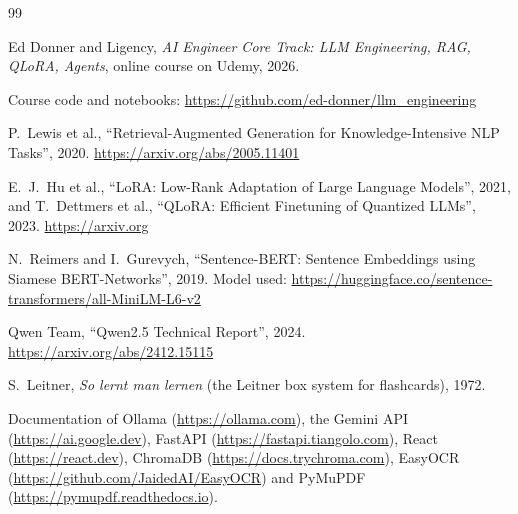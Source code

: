 \documentclass[12pt,a4paper]{report}
\begin{document}
\begin{thebibliography}{99}
\small

 Ed Donner and Ligency, \emph{AI Engineer Core Track: LLM Engineering, RAG,
  QLoRA, Agents}, online course on Udemy, 2026.

 Course code and notebooks: \url{https://github.com/ed-donner/llm_engineering}

 P.~Lewis et al., ``Retrieval-Augmented Generation for Knowledge-Intensive NLP
  Tasks'', 2020. \url{https://arxiv.org/abs/2005.11401}

 E.~J.~Hu et al., ``LoRA: Low-Rank Adaptation of Large Language Models'', 2021,
  and T.~Dettmers et al., ``QLoRA: Efficient Finetuning of Quantized LLMs'', 2023.
  \url{https://arxiv.org}

 N.~Reimers and I.~Gurevych, ``Sentence-BERT: Sentence Embeddings using
  Siamese BERT-Networks'', 2019. Model used: \url{https://huggingface.co/sentence-transformers/all-MiniLM-L6-v2}

 Qwen Team, ``Qwen2.5 Technical Report'', 2024.
  \url{https://arxiv.org/abs/2412.15115}

 S.~Leitner, \emph{So lernt man lernen} (the Leitner box system for
  flashcards), 1972.

 Documentation of Ollama (\url{https://ollama.com}), the Gemini API
  (\url{https://ai.google.dev}), FastAPI (\url{https://fastapi.tiangolo.com}), React
  (\url{https://react.dev}), ChromaDB (\url{https://docs.trychroma.com}), EasyOCR
  (\url{https://github.com/JaidedAI/EasyOCR}) and PyMuPDF (\url{https://pymupdf.readthedocs.io}).

\end{thebibliography}
\end{document}
